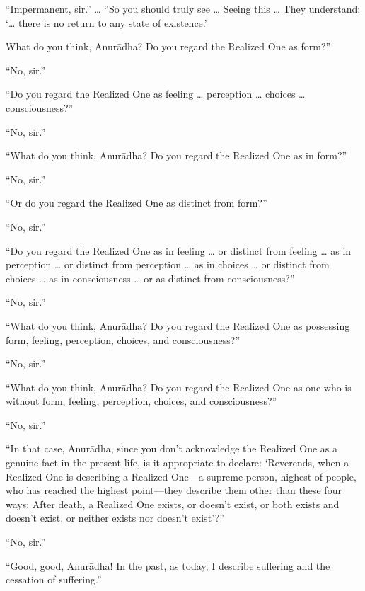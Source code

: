 \documentclass[12pt,openany]{book}%
\begin{document}
“Impermanent, sir.” … “So you should truly see … Seeing this … They understand: ‘… there is no return to any state of existence.’ 

What do you think, \textsanskrit{Anurādha}? Do you regard the Realized One as form?” 

“No, sir.” 

“Do you regard the Realized One as feeling … perception … choices … consciousness?” 

“No, sir.” 

“What do you think, \textsanskrit{Anurādha}? Do you regard the Realized One as in form?” 

“No, sir.” 

“Or do you regard the Realized One as distinct from form?” 

“No, sir.” 

“Do you regard the Realized One as in feeling … or distinct from feeling … as in perception … or distinct from perception … as in choices … or distinct from choices … as in consciousness … or as distinct from consciousness?” 

“No, sir.” 

“What do you think, \textsanskrit{Anurādha}? Do you regard the Realized One as possessing form, feeling, perception, choices, and consciousness?” 

“No, sir.” 

“What do you think, \textsanskrit{Anurādha}? Do you regard the Realized One as one who is without form, feeling, perception, choices, and consciousness?” 

“No, sir.” 

“In that case, \textsanskrit{Anurādha}, since you don’t acknowledge the Realized One as a genuine fact in the present life, is it appropriate to declare: ‘Reverends, when a Realized One is describing a Realized One—a supreme person, highest of people, who has reached the highest point—they describe them other than these four ways: After death, a Realized One exists, or doesn’t exist, or both exists and doesn’t exist, or neither exists nor doesn’t exist’?” 

“No, sir.” 

“Good, good, \textsanskrit{Anurādha}! In the past, as today, I describe suffering and the cessation of suffering.” 
\end{document}
